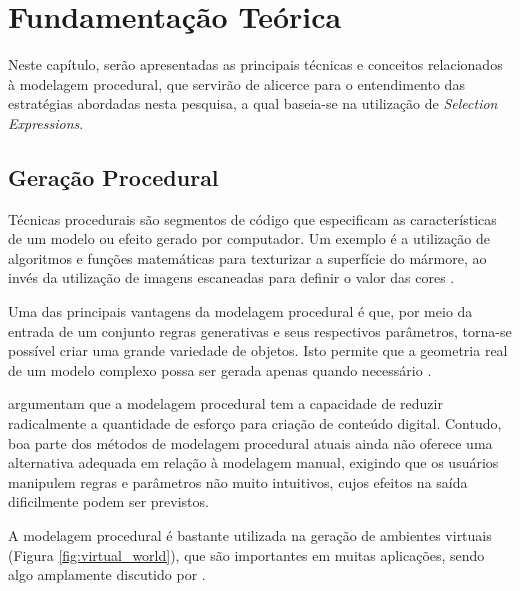 \chapter{Fundamentação Teórica}
\label{cap:fundamentacao-teorica}

Neste capítulo, serão apresentadas as principais técnicas e conceitos relacionados à modelagem procedural, que servirão de alicerce para o entendimento das estratégias abordadas nesta pesquisa, a qual baseia-se na utilização de \textit{Selection Expressions}.

\section{Geração Procedural}
\label{sec:geracao_procedural}

Técnicas procedurais são segmentos de código que especificam as características de um modelo ou efeito gerado por computador. Um exemplo é a utilização de algoritmos e funções matemáticas para texturizar a superfície do mármore, ao invés da utilização de imagens escaneadas para definir o valor das cores \cite{ebert2002}.

Uma das principais vantagens da modelagem procedural é que, por meio da entrada de um conjunto regras generativas e seus respectivos parâmetros, torna-se possível criar uma grande variedade de objetos. Isto permite que a geometria real de um modelo complexo possa ser gerada apenas quando necessário \cite{smelik2014}.

 argumentam que a modelagem procedural tem a capacidade de reduzir radicalmente a quantidade de esforço para criação de conteúdo digital. Contudo, boa parte dos métodos de modelagem procedural atuais ainda não oferece uma alternativa adequada em relação à modelagem manual, exigindo que os usuários manipulem regras e parâmetros não muito intuitivos, cujos efeitos na saída dificilmente podem ser previstos.

A modelagem procedural é bastante utilizada na geração de ambientes virtuais (Figura \ref{fig:virtual_world}), que são importantes em muitas aplicações, sendo algo amplamente discutido por .

\begin{figure}[h!]
	\centering
	\captionsetup{width=15cm}
	{}	
\end{figure}

